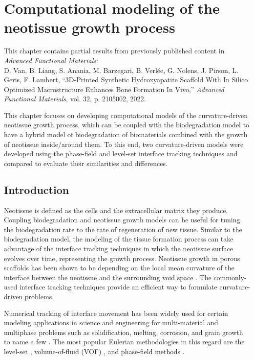 \chapter{Computational modeling of the neotissue growth process}\label{ch:tissue}

\begin{shaded}
This chapter contains partial results from previously published content in \textit{Advanced Functional Materials}:\\
D. Van, B. Liang, S. Anania, M. Barzegari, B. Verlée, G. Nolens, J. Pirson, L. Geris, F. Lambert, ``3D-Printed Synthetic Hydroxyapatite Scaffold With In Silico Optimized Macrostructure Enhances Bone Formation In Vivo,'' \textit{Advanced Functional Materials}, vol. 32, p. 2105002, 2022.
\end{shaded}

This chapter focuses on developing computational models of the curvature-driven neotissue growth process, which can be coupled with the biodegradation model to have a hybrid model of biodegradation of biomaterials combined with the growth of neotissue inside/around them. To this end, two curvature-driven models were developed using the phase-field and level-set interface tracking techniques and compared to evaluate their similarities and differences.

\section{Introduction}

Neotissue is defined as the cells and the extracellular matrix they produce. Coupling biodegradation and neotissue growth models can be useful for tuning the biodegradation rate to the rate of regeneration of new tissue. Similar to the biodegradation model, the modeling of the tissue formation process can take advantage of the interface tracking techniques in which the neotissue surface evolves over time, representing the growth process. Neotissue growth in porous scaffolds has been shown to be depending on the local mean curvature of the interface between the neotissue and the surrounding void space \cite{Bidan2012, Bidan2012a, Rumpler2008}. The commonly-used interface tracking techniques provide an efficient way to formulate curvature-driven problems.


Numerical tracking of interface movement has been widely used for certain modeling applications in science and engineering for multi-material and multiphase problems such as solidification, melting, corrosion, and grain growth to name a few \cite{Sun2007}. The most popular Eulerian methodologies in this regard are the level-set \cite{Osher1988,Andrew2000,RonaldFedkiw2002}, volume-of-fluid (\gls{VOF}) \cite{Rider1998}, and phase-field methods \cite{Boettinger2002,Bellemans2017}.

